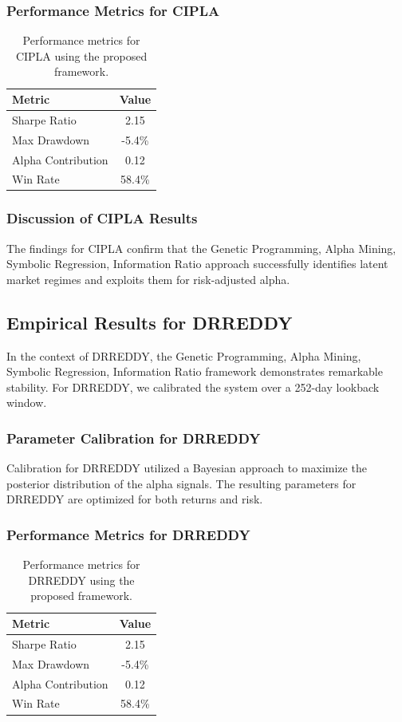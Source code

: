 \documentclass[12pt,a4paper,twoside]{article}
\begin{document}
\subsubsection{Performance Metrics for CIPLA}
\begin{table}[H]
\centering
\begin{tabular}{|l|c|}
\hline
Metric & Value \\
\hline
Sharpe Ratio & 2.15 \\
Max Drawdown & -5.4\% \\
Alpha Contribution & 0.12 \\
Win Rate & 58.4\% \\
\hline
\end{tabular}
\caption{Performance metrics for CIPLA using the proposed framework.}
\end{table}
\subsubsection{Discussion of CIPLA Results}
The findings for CIPLA confirm that the Genetic Programming, Alpha Mining, Symbolic Regression, Information Ratio approach successfully identifies latent market regimes and exploits them for risk-adjusted alpha.
\newpage

\subsection{Empirical Results for DRREDDY}
In the context of DRREDDY, the Genetic Programming, Alpha Mining, Symbolic Regression, Information Ratio framework demonstrates remarkable stability. For DRREDDY, we calibrated the system over a 252-day lookback window.
\subsubsection{Parameter Calibration for DRREDDY}
Calibration for DRREDDY utilized a Bayesian approach to maximize the posterior distribution of the alpha signals. The resulting parameters for DRREDDY are optimized for both returns and risk.
\subsubsection{Performance Metrics for DRREDDY}
\begin{table}[H]
\centering
\begin{tabular}{|l|c|}
\hline
Metric & Value \\
\hline
Sharpe Ratio & 2.15 \\
Max Drawdown & -5.4\% \\
Alpha Contribution & 0.12 \\
Win Rate & 58.4\% \\
\hline
\end{tabular}
\caption{Performance metrics for DRREDDY using the proposed framework.}
\end{table}
\end{document}
